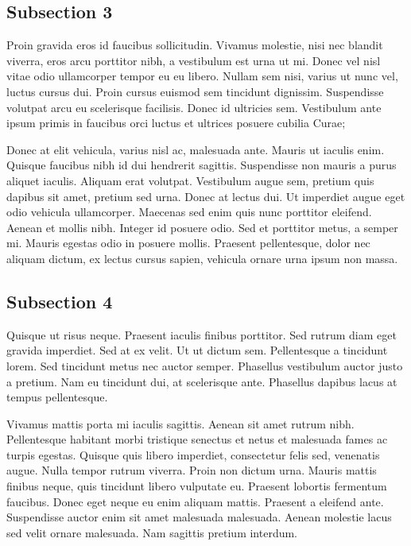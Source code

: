 \subsection{Subsection 3}

Proin gravida eros id faucibus sollicitudin. Vivamus molestie, nisi nec blandit viverra, eros arcu porttitor nibh, a vestibulum est urna ut mi. Donec vel nisl vitae odio ullamcorper tempor eu eu libero. Nullam sem nisi, varius ut nunc vel, luctus cursus dui. Proin cursus euismod sem tincidunt dignissim. Suspendisse volutpat arcu eu scelerisque facilisis. Donec id ultricies sem. Vestibulum ante ipsum primis in faucibus orci luctus et ultrices posuere cubilia Curae;

Donec at elit vehicula, varius nisl ac, malesuada ante. Mauris ut iaculis enim. Quisque faucibus nibh id dui hendrerit sagittis. Suspendisse non mauris a purus aliquet iaculis. Aliquam erat volutpat. Vestibulum augue sem, pretium quis dapibus sit amet, pretium sed urna. Donec at lectus dui. Ut imperdiet augue eget odio vehicula ullamcorper. Maecenas sed enim quis nunc porttitor eleifend. Aenean et mollis nibh. Integer id posuere odio. Sed et porttitor metus, a semper mi. Mauris egestas odio in posuere mollis. Praesent pellentesque, dolor nec aliquam dictum, ex lectus cursus sapien, vehicula ornare urna ipsum non massa.

\subsection{Subsection 4}

Quisque ut risus neque. Praesent iaculis finibus porttitor. Sed rutrum diam eget gravida imperdiet. Sed at ex velit. Ut ut dictum sem. Pellentesque a tincidunt lorem. Sed tincidunt metus nec auctor semper. Phasellus vestibulum auctor justo a pretium. Nam eu tincidunt dui, at scelerisque ante. Phasellus dapibus lacus at tempus pellentesque.

Vivamus mattis porta mi iaculis sagittis. Aenean sit amet rutrum nibh. Pellentesque habitant morbi tristique senectus et netus et malesuada fames ac turpis egestas. Quisque quis libero imperdiet, consectetur felis sed, venenatis augue. Nulla tempor rutrum viverra. Proin non dictum urna. Mauris mattis finibus neque, quis tincidunt libero vulputate eu. Praesent lobortis fermentum faucibus. Donec eget neque eu enim aliquam mattis. Praesent a eleifend ante. Suspendisse auctor enim sit amet malesuada malesuada. Aenean molestie lacus sed velit ornare malesuada. Nam sagittis pretium interdum.
\fi